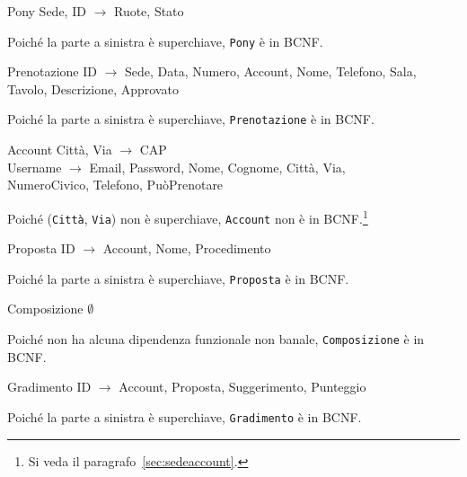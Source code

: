 \begin{samepage}
\begin{funcdep}{Pony}
    Sede, ID $\to$ Ruote, Stato
\end{funcdep}
Poiché la parte a sinistra è superchiave, {\tt Pony} è in BCNF.
\end{samepage}

\begin{samepage}
\begin{funcdep}{Prenotazione}
    ID $\to$ Sede, Data, Numero, Account, Nome, Telefono, Sala,\\
        \indent\indent\indent\indent\indent Tavolo, Descrizione, Approvato
\end{funcdep}
Poiché la parte a sinistra è superchiave, {\tt Prenotazione} è in BCNF.
\end{samepage}

\begin{samepage}
\begin{funcdep}{Account}
    Città, Via $\to$ CAP\\
    Username $\to$ Email, Password, Nome, Cognome, Città, Via,\\
        \indent\indent\indent\indent\indent NumeroCivico, Telefono, PuòPrenotare
\end{funcdep}
Poiché ({\tt Città}, {\tt Via}) non è superchiave, {\tt Account} non
è in BCNF.\footnote{Si veda il paragrafo~\vref{sec:sedeaccount}.}
\end{samepage}

\begin{samepage}
\begin{funcdep}{Proposta}
    ID $\to$ Account, Nome, Procedimento
\end{funcdep}
Poiché la parte a sinistra è superchiave, {\tt Proposta} è in BCNF.
\end{samepage}

\begin{samepage}
\begin{funcdep}{Composizione}
    $\emptyset$
\end{funcdep}
Poiché non ha alcuna dipendenza funzionale non banale, {\tt Composizione} è in BCNF.
\end{samepage}

\begin{samepage}
\begin{funcdep}{Gradimento}
    ID $\to$ Account, Proposta, Suggerimento, Punteggio
\end{funcdep}
Poiché la parte a sinistra è superchiave, {\tt Gradimento} è in BCNF.
\end{samepage}

